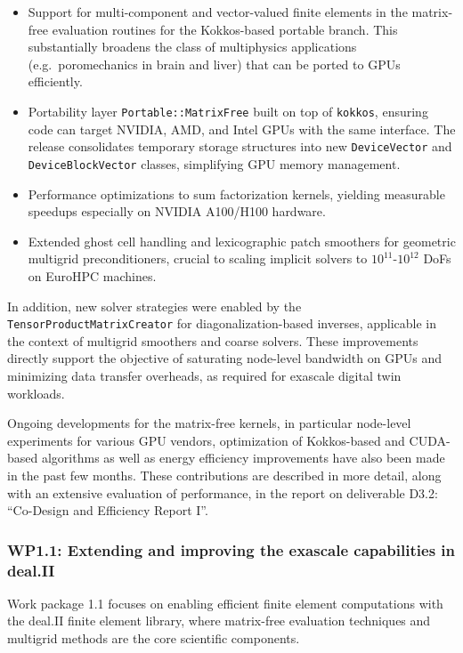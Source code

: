\documentclass[a4paper,12pt, numbers]{article}
\begin{document}
	
	\begin{itemize}
		\item Support for multi-component and vector-valued finite elements in the
		matrix-free evaluation routines for the Kokkos-based portable branch. This substantially broadens the class
		of multiphysics applications (e.g.\ poromechanics in brain and liver)
		that can be ported to GPUs efficiently.
		\item Portability layer \texttt{Portable::MatrixFree} built on top of
		\texttt{kokkos}, ensuring code can target NVIDIA, AMD, and Intel GPUs with the
		same interface. The release consolidates temporary storage structures
		into new \texttt{DeviceVector} and \texttt{DeviceBlockVector} classes,
		simplifying GPU memory management.
		\item Performance optimizations to sum factorization kernels, yielding
		measurable speedups especially on NVIDIA A100/H100 hardware.
		\item Extended ghost cell handling and lexicographic patch smoothers for
		geometric multigrid preconditioners, crucial to scaling implicit solvers
		to $10^{11}$-$10^{12}$ DoFs on EuroHPC machines.
	\end{itemize}
	
	In addition, new solver strategies were enabled by the\\
	\texttt{TensorProductMatrixCreator} for diagonalization-based inverses,
	applicable in the context of multigrid smoothers and coarse solvers.
	These improvements directly support the objective of saturating node-level
	bandwidth on GPUs and minimizing data transfer overheads, as required for
	exascale digital twin workloads.
	
	Ongoing developments for the matrix-free kernels, in particular node-level
	experiments for various GPU vendors, optimization of Kokkos-based and
	CUDA-based algorithms as well as energy efficiency improvements have also been
	made in the past few months. These contributions are described in more detail,
	along with an extensive evaluation of performance, in the report on
	deliverable D3.2: ``Co-Design and Efficiency Report I''.
	
	
	\subsubsection*{WP1.1: Extending and improving the exascale capabilities in deal.II} %

Work package 1.1 focuses on enabling efficient finite element computations
with the deal.II finite element library, where matrix-free evaluation
techniques and multigrid methods are the core scientific components.
\end{document}
